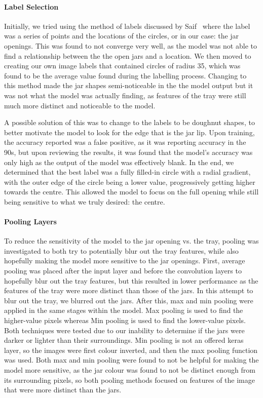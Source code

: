 \documentclass[11pt]{article}
\begin{document}
                \paragraph{Label Selection}
                    Initially, we tried using the method of labels discussed by Saif~\cite{saif} where the label was a series of points and the locations of the circles, or in our case: the jar openings. This was found to not converge very well, as the model was not able to find a relationship between the the open jars and a location. We then moved to creating our own image labels that contained circles of radius 35, which was found to be the average value found during the labelling process. Changing to this method made the jar shapes semi-noticeable in the the model output but it was not what the model was actually finding, as features of the tray were still much more distinct and noticeable to the model. 
                    
                    A possible solution of this was to change to the labels to be doughnut shapes, to better motivate the model to look for the edge that is the jar lip. Upon training, the accuracy reported was a false positive, as it was reporting accuracy in the 90s, but upon reviewing the results, it was found that the model's accuracy was only high as the output of the model was effectively blank. In the end, we determined that the best label was a fully filled-in circle with a radial gradient, with the outer edge of the circle being a lower value, progressively getting higher towards the centre. This allowed the model to focus on the full opening while still being sensitive to what we truly desired: the centre.

                \paragraph{Pooling Layers}
                    To reduce the sensitivity of the model to the jar opening vs. the tray, pooling was investigated to both try to potentially blur out the tray features, while also hopefully making the model more sensitive to the jar openings. First, average pooling was placed after the input layer and before the convolution layers to hopefully blur out the tray features, but this resulted in lower performance as the features of the tray were more distinct than those of the jars. In this attempt to blur out the tray, we blurred out the jars. After this, max and min pooling were applied in the same stages within the model. Max pooling is used to find the higher-value pixels whereas Min pooling is used to find the lower-value pixels. Both techniques were tested due to our inability to determine if the jars were darker or lighter than their surroundings. Min pooling is not an offered keras layer, so the images were first colour inverted, and then the max pooling function was used. Both max and min pooling were found to not be helpful for making the model more sensitive, as the jar colour was found to not be distinct enough from its surrounding pixels, so both pooling methods focused on features of the image that were more distinct than the jars. 
\end{document}
